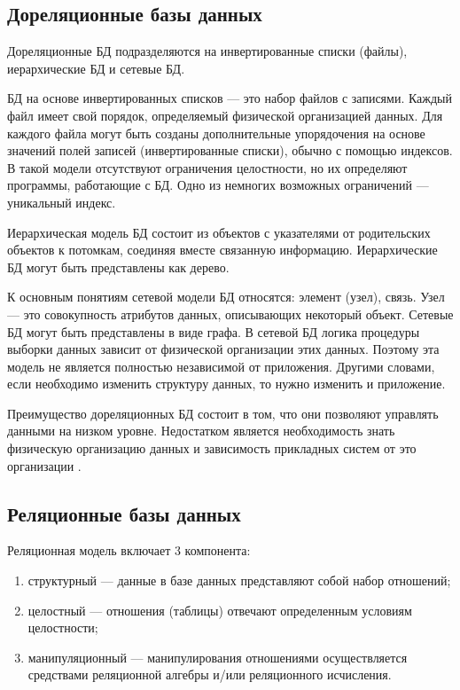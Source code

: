 \subsection{Дореляционные базы данных}

Дореляционные БД подразделяются на инвертированные списки (файлы), иерархические БД и сетевые БД.

БД на основе инвертированных списков --- это набор файлов с записями. Каждый файл имеет свой порядок, определяемый физической организацией данных. Для каждого файла могут быть созданы дополнительные упорядочения на основе значений полей записей (инвертированные списки), обычно с помощью индексов. В такой модели отсутствуют ограничения целостности, но их определяют программы, работающие с БД. Одно из немногих возможных ограничений --- уникальный индекс.

Иерархическая модель БД состоит из объектов с указателями от родительских объектов к потомкам, соединяя вместе связанную информацию. Иерархические БД могут быть представлены как дерево. 

К основным понятиям сетевой модели БД относятся: элемент (узел), связь. Узел --- это совокупность атрибутов данных, описывающих некоторый объект. Сетевые БД могут быть представлены в виде графа. В сетевой БД логика процедуры выборки данных зависит от физической организации этих данных. Поэтому эта модель не является полностью независимой от приложения. Другими словами, если необходимо изменить структуру данных, то нужно изменить и приложение. 

Преимущество дореляционных БД состоит в том, что они позволяют управлять данными на низком уровне. Недостатком является необходимость знать физическую организацию данных и зависимость прикладных систем от это организации \cite{info_db_kuznecov}.

\subsection{Реляционные базы данных}

Реляционная модель включает 3 компонента: 

\begin{enumerate}[label={\arabic*)}]
	\item структурный --- данные в базе данных представляют собой набор отношений;
	\item целостный --- отношения (таблицы) отвечают определенным условиям целостности;
	\item манипуляционный --- манипулирования отношениями осуществляется средствами реляционной алгебры и/или реляционного исчисления.
\end{enumerate}

